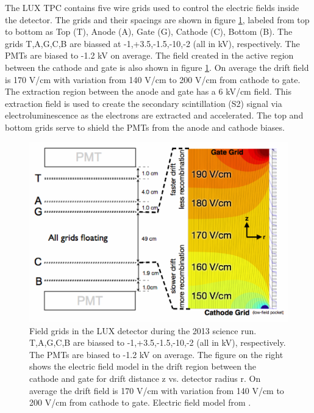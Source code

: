 The LUX TPC contains five wire grids used to control the electric fields inside the detector. The grids and their spacings are shown in figure \ref{fig:LUX_Fields}, labeled from top to bottom as Top  (T), Anode (A), Gate (G), Cathode (C), Bottom (B). The grids T,A,G,C,B are biassed at -1,+3.5,-1.5,-10,-2 (all in kV), respectively. The PMTs are biased to -1.2 kV on average. The field created in the active region between the cathode and gate is also shown in figure \ref{fig:LUX_Fields}. On average the drift field is 170 V/cm with variation from 140 V/cm to 200 V/cm  from cathode to gate. The extraction region between the anode and gate has a 6 kV/cm field. This extraction field is used to create the secondary scintillation (S2) signal via electroluminescence as the electrons are extracted and accelerated. The top and bottom grids serve to shield the PMTs from the anode and cathode biases.  

 \begin{figure}[h!]\centering
\includegraphics[scale=.4]{Chapter_LUX_Det/LUX_Feild_Grids_with_Field.png}
\caption{Field grids in the LUX detector during the 2013 science run. T,A,G,C,B are biassed to -1,+3.5,-1.5,-10,-2 (all in kV), respectively. The PMTs are biased to -1.2 kV on average. The figure on the right shows the electric field model in the drift region between the cathode and gate for drift distance z vs. detector radius r. On average the drift field is 170 V/cm with variation from 140 V/cm to 200 V/cm  from cathode to gate. Electric field model from  \cite{Scott_E_Field}.}
\label{fig:LUX_Fields}
\end{figure}

